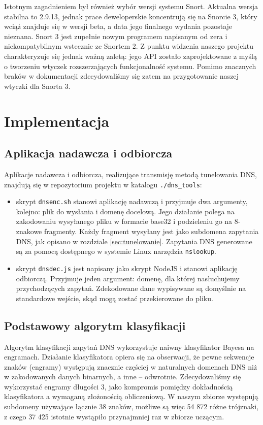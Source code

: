 \documentclass{eiti-raport}
\begin{document}
Istotnym zagadnieniem był również wybór wersji systemu Snort. Aktualna wersja stabilna to 2.9.13, jednak prace deweloperskie koncentrują się na Snorcie 3, który wciąż znajduje się w wersji beta, a data jego finalnego wydania pozostaje nieznana. Snort 3 jest zupełnie nowym programem napisanym od zera i niekompatybilnym wstecznie ze Snortem 2. Z punktu widzenia naszego projektu charakteryzuje się jednak ważną zaletą: jego API zostało zaprojektowane z myślą o tworzeniu wtyczek rozszerzających funkcjonalność systemu. Pomimo znacznych braków w dokumentacji zdecydowaliśmy się zatem na przygotowanie naszej wtyczki dla Snorta 3. 

\section{Implementacja} \label{sec:implementation}

\subsection{Aplikacja nadawcza i odbiorcza} \label{sec:dnsenc}
Aplikacje nadawcza i odbiorcza, realizujące transmisję metodą tunelowania DNS, znajdują się w repozytorium projektu w katalogu \texttt{./dns\_tools}:
\begin{itemize}
	\item skrypt \texttt{dnsenc.sh} stanowi aplikację nadawczą i przyjmuje dwa argumenty, kolejno: plik do wysłania i domenę docelową. Jego działanie polega na zakodowaniu wysyłanego pliku w formacie base32 i podzieleniu go na 8-znakowe fragmenty. Każdy fragment wysyłany jest jako subdomena zapytania DNS, jak opisano w rozdziale \ref{sec:tunelowanie}. Zapytania DNS generowane są za pomocą dostępnego w systemie Linux narzędzia \texttt{nslookup}. 
	\item skrypt \texttt{dnsdec.js} jest napisany jako skrypt NodeJS i stanowi aplikację odbiorczą. Przyjmuje jeden argument: domenę, dla której nasłuchujemy przychodzących zapytań. Zdekodowane dane wypisywane są domyślnie na standardowe wejście, skąd mogą zostać przekierowane do pliku. 
\end{itemize}

\subsection{Podstawowy algorytm klasyfikacji} \label{sec:bayes}
Algorytm klasyfikacji zapytań DNS wykorzystuje naiwny klasyfikator Bayesa na engramach. Działanie klasyfikatora opiera się na obserwacji, że pewne sekwencje znaków (engramy) występują znacznie częściej w naturalnych domenach DNS niż w zakodowanych danych binarnych, a inne -- odwrotnie. Zdecydowaliśmy się wykorzystać engramy długości 3, jako kompromis pomiędzy dokładnością klasyfikatora a wymaganą złożonością obliczeniową. W naszym zbiorze występują subdomeny używające łącznie 38 znaków, możliwe są więc 54 872 różne trójznaki, z czego 37 425 istotnie wystąpiło przynajmniej raz w zbiorze uczącym. 
\end{document}
